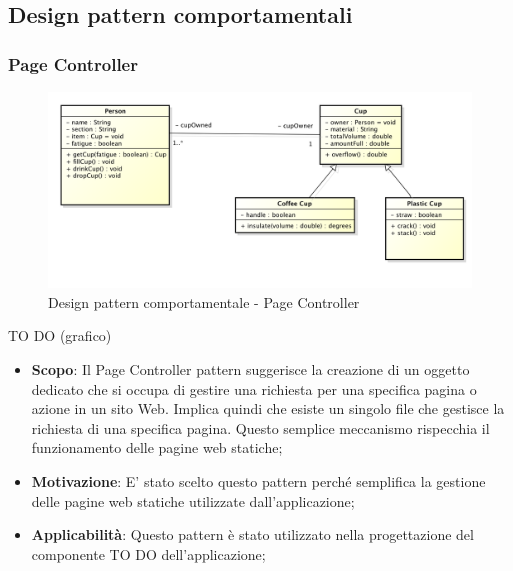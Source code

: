
	\clearpage 
	\newpage
	\subsection{Design pattern comportamentali} %
		\subsubsection{Page Controller} %
		
		
		\begin{figure}[htbp]
			\centering
			\centerline{\includegraphics[scale=0.3]{./images/example_graph.png}}
			\caption{Design pattern comportamentale - Page Controller}
		\end{figure}
		TO DO (grafico)
		
		
		\begin{itemize}
			\item \textbf{Scopo}: Il Page Controller pattern suggerisce la creazione di un oggetto dedicato che si occupa di gestire una richiesta per una specifica pagina o azione in un sito Web. Implica quindi che esiste un singolo file che gestisce la richiesta di una specifica pagina. Questo semplice meccanismo rispecchia il funzionamento delle pagine web statiche;
					
			\item \textbf{Motivazione}: E' stato scelto questo pattern perché semplifica la gestione delle pagine web statiche utilizzate dall'applicazione;
			
			\item \textbf{Applicabilità}: Questo pattern è stato utilizzato nella progettazione del componente TO DO dell'applicazione;
			
		\end{itemize}
		
		
		\newpage
